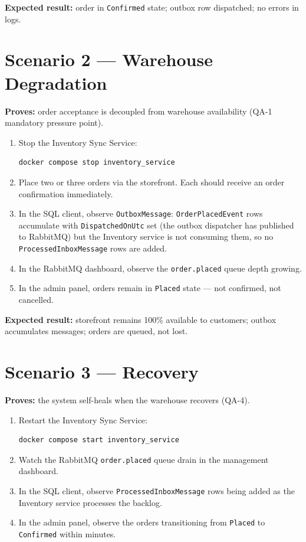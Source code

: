 \textbf{Expected result:} order in \texttt{Confirmed} state; outbox row dispatched; no errors in logs.

\section{Scenario 2 — Warehouse Degradation}
\label{sec:demo-degraded}

\textbf{Proves:} order acceptance is decoupled from warehouse availability (QA-1 mandatory pressure point).

\begin{enumerate}
    \item Stop the Inventory Sync Service:
    \begin{lstlisting}[language=bash]
docker compose stop inventory_service
    \end{lstlisting}
    \item Place two or three orders via the storefront. Each should receive an order confirmation immediately.
    \item In the SQL client, observe \texttt{OutboxMessage}: \texttt{OrderPlacedEvent} rows accumulate with \texttt{DispatchedOnUtc} set (the outbox dispatcher has published to RabbitMQ) but the Inventory service is not consuming them, so no \texttt{ProcessedInboxMessage} rows are added.
    \item In the RabbitMQ dashboard, observe the \texttt{order.placed} queue depth growing.
    \item In the admin panel, orders remain in \texttt{Placed} state — not confirmed, not cancelled.
\end{enumerate}

\textbf{Expected result:} storefront remains 100\% available to customers; outbox accumulates messages; orders are queued, not lost.

\section{Scenario 3 — Recovery}
\label{sec:demo-recovery}

\textbf{Proves:} the system self-heals when the warehouse recovers (QA-4).

\begin{enumerate}
    \item Restart the Inventory Sync Service:
    \begin{lstlisting}[language=bash]
docker compose start inventory_service
    \end{lstlisting}
    \item Watch the RabbitMQ \texttt{order.placed} queue drain in the management dashboard.
    \item In the SQL client, observe \texttt{ProcessedInboxMessage} rows being added as the Inventory service processes the backlog.
    \item In the admin panel, observe the orders transitioning from \texttt{Placed} to \texttt{Confirmed} within minutes.
\end{enumerate}


